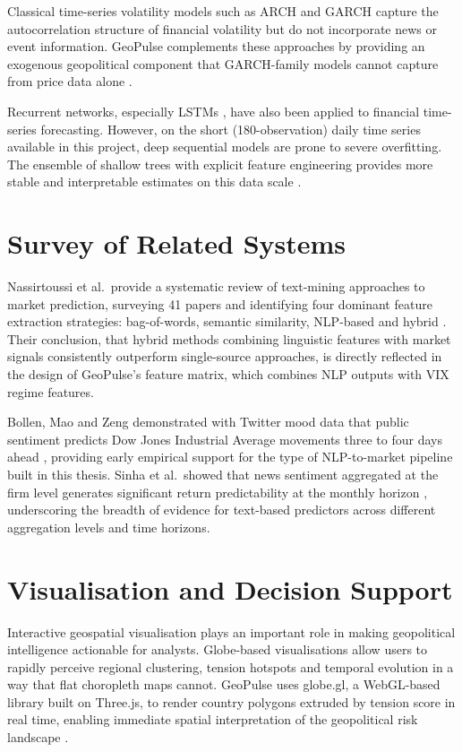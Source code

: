 \documentclass[12pt,a4paper]{report}
\begin{document}
Classical time-series volatility models such as ARCH \cite{engle1982} and
GARCH \cite{bollerslev1986} capture the autocorrelation structure of financial
volatility but do not incorporate news or event information. GeoPulse
complements these approaches by providing an exogenous geopolitical component
that GARCH-family models cannot capture from price data alone \cite{engle1982,
bollerslev1986}.

Recurrent networks, especially LSTMs \cite{hochreiter1997}, have also been
applied to financial time-series forecasting. However, on the short
(180-observation) daily time series available in this project, deep sequential
models are prone to severe overfitting. The ensemble of shallow trees with
explicit feature engineering provides more stable and interpretable estimates
on this data scale \cite{ke2017, prokhorenkova2018}.

\section{Survey of Related Systems}

Nassirtoussi et al.\ provide a systematic review of text-mining approaches
to market prediction, surveying 41 papers and identifying four dominant
feature extraction strategies: bag-of-words, semantic similarity, NLP-based
and hybrid \cite{nassirtoussi2014}. Their conclusion, that hybrid methods
combining linguistic features with market signals consistently outperform
single-source approaches, is directly reflected in the design of GeoPulse's
feature matrix, which combines NLP outputs with VIX regime features.

Bollen, Mao and Zeng demonstrated with Twitter mood data that public sentiment
predicts Dow Jones Industrial Average movements three to four days ahead
\cite{bollen2011}, providing early empirical support for the type of
NLP-to-market pipeline built in this thesis. Sinha et al.\ showed that
news sentiment aggregated at the firm level generates significant return
predictability at the monthly horizon \cite{sinha2022}, underscoring the
breadth of evidence for text-based predictors across different aggregation
levels and time horizons.

\section{Visualisation and Decision Support}

Interactive geospatial visualisation plays an important role in making
geopolitical intelligence actionable for analysts. Globe-based visualisations
allow users to rapidly perceive regional clustering, tension hotspots and
temporal evolution in a way that flat choropleth maps cannot. GeoPulse
uses globe.gl, a WebGL-based library built on Three.js, to render country
polygons extruded by tension score in real time, enabling immediate spatial
interpretation of the geopolitical risk landscape \cite{caldara2022}.
\end{document}
